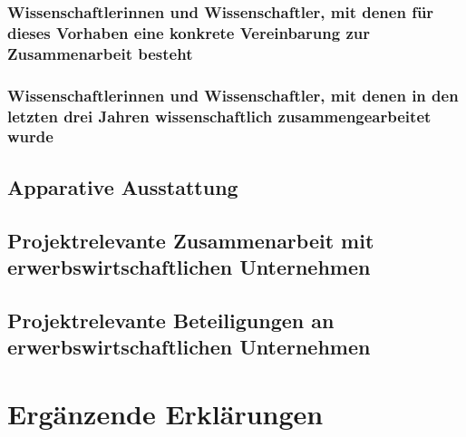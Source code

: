 \documentclass{scrartcl}
\begin{document}
\subsubsection{Wissenschaftlerinnen und Wissenschaftler, mit denen für dieses Vorhaben eine konkrete Vereinbarung zur Zusammenarbeit besteht}

\subsubsection{Wissenschaftlerinnen und Wissenschaftler, mit denen in den letzten drei Jahren wissenschaftlich zusammengearbeitet wurde}

\subsection{Apparative Ausstattung}

\subsection{Projektrelevante Zusammenarbeit mit erwerbswirtschaftlichen Unternehmen}

\subsection{Projektrelevante Beteiligungen an erwerbswirtschaftlichen Unternehmen}

\section{Ergänzende Erklärungen}
\end{document}
